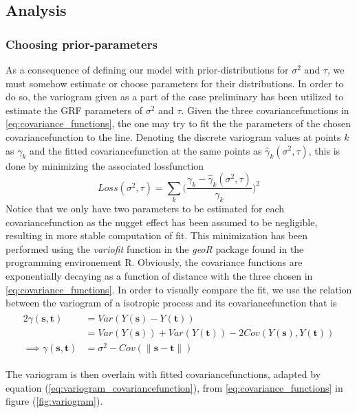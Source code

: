 \subsection{Analysis}
\subsubsection{Choosing prior-parameters}
As a consequence of defining our model with prior-distributions for $\sigma^2$ and $\tau$, we must somehow estimate or choose parameters for their distributions. In order to do so, the variogram given as a part of the case preliminary has been utilized to estimate the GRF parameters of $\sigma^2$ and $\tau$. Given the three covariancefunctions in \ref{eq:covariance_functions}, the one may try to fit the the parameters of the chosen covariancefunction to the line. Denoting the discrete variogram values at points $k$ as $\gamma_k$ and the fitted covariancefunction at the same points as $\hat{\gamma}_k(\sigma^2, \tau)$, this is done by minimizing the associated lossfunction
\begin{equation}
Loss(\sigma^2, \tau) = \sum_k \bigg( \frac{\gamma_k - \hat{\gamma}_k(\sigma^2, \tau)}{\gamma_k} \bigg)^2
\end{equation}
Notice that we only have two parameters to be estimated for each covariancefunction as the nugget effect has been assumed to be negligible, resulting in more stable computation of fit. This minimization has been performed using the \textit{variofit} function in the \textit{geoR} package found in the programming environement R. Obviously, the covariance functions are exponentially decaying as a function of distance with the three chosen in \ref{eq:covariance_functions}. In order to visually compare the fit, we use the relation between the variogram of a isotropic process and its covariancefunction that is
\begin{align} \label{eq:variogram_covariancefunction}
\begin{split}
    2\gamma(\textbf{s},\textbf{t}) &= Var(Y(\textbf{s}) - Y(\textbf{t})) \\
    &= Var(Y(\textbf{s})) + Var(Y(\textbf{t})) - 2Cov(Y(\textbf{s}),Y(\textbf{t})) \\
    \implies \gamma(\textbf{s},\textbf{t}) &= \sigma^2 - Cov(\|\textbf{s}-\textbf{t}\|)
\end{split}
\end{align}

The variogram is then overlain with fitted covariancefunctions, adapted by equation (\ref{eq:variogram_covariancefunction}), from \ref{eq:covariance_functions} in figure (\ref{fig:variogram}).  

